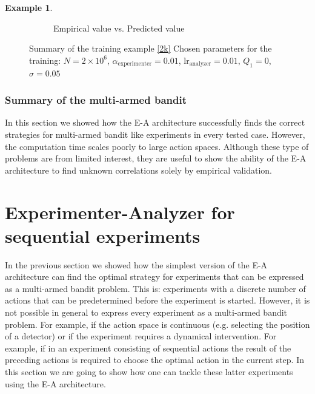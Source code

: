 \documentclass[11pt,a4paper,twoside]{report}
\newcommand{\+}{\textnormal{+} }
\theoremstyle{definition}
\newtheorem{myex}[mythm]{Example}
\numberwithin{equation}{chapter}
\begin{document}
\begin{myex}
\begin{figure}[]
\begin{subfigure}{.5\textwidth}
        \caption{Empirical value vs. Predicted value}
        \label{fig:actionsMAB6}
      \end{subfigure}
      \caption{ Summary of the training example \eqref{2k}
         Chosen parameters for the training: $N=2\times10^6$,
      $\alpha_\text{experimenter}=0.01$, $\text{lr}_\text{analyzer}=0.01$,
      $Q_1=0$, $\sigma=0.05$}
    \end{figure}
  \end{myex}

  \subsection{Summary of the multi-armed bandit}
  In this section we showed how the E-A architecture successfully finds the
  correct strategies for multi-armed bandit like experiments in every tested
  case. However, the computation time scales poorly to large action spaces.
  Although these type of problems are from limited interest, they are
  useful to show the ability of the E-A architecture to find unknown
  correlations solely by empirical validation.
  
  



\chapter{Experimenter-Analyzer for sequential experiments}

In the previous section we showed how the simplest version of the E-A
architecture can find the optimal strategy for experiments that can be expressed
as a multi-armed bandit problem. This is: experiments with a discrete number of
actions that can be predetermined before the experiment is started. However, it
is not possible in general to express every experiment as a multi-armed bandit
problem. For example, if the action space is continuous (e.g. selecting the
position of a detector) or if the experiment requires a dynamical intervention.
For example, if in an experiment consisting of sequential actions the result of
the preceding actions is required to choose the optimal action in the current
step. In this section we are going to show how one can tackle these latter
experiments using the E-A architecture. 
\end{document}
